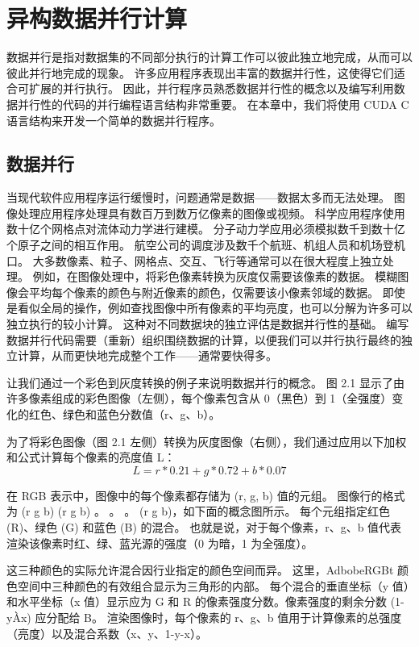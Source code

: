 \section{异构数据并行计算}

数据并行是指对数据集的不同部分执行的计算工作可以彼此独立地完成，从而可以彼此并行地完成的现象。 许多应用程序表现出丰富的数据并行性，这使得它们适合可扩展的并行执行。 因此，并行程序员熟悉数据并行性的概念以及编写利用数据并行性的代码的并行编程语言结构非常重要。 在本章中，我们将使用 CUDA C 语言结构来开发一个简单的数据并行程序。

\subsection{数据并行}
当现代软件应用程序运行缓慢时，问题通常是数据——数据太多而无法处理。 图像处理应用程序处理具有数百万到数万亿像素的图像或视频。 科学应用程序使用数十亿个网格点对流体动力学进行建模。 分子动力学应用必须模拟数千到数十亿个原子之间的相互作用。 航空公司的调度涉及数千个航班、机组人员和机场登机口。 大多数像素、粒子、网格点、交互、飞行等通常可以在很大程度上独立处理。 例如，在图像处理中，将彩色像素转换为灰度仅需要该像素的数据。 模糊图像会平均每个像素的颜色与附近像素的颜色，仅需要该小像素邻域的数据。 即使是看似全局的操作，例如查找图像中所有像素的平均亮度，也可以分解为许多可以独立执行的较小计算。 这种对不同数据块的独立评估是数据并行性的基础。 编写数据并行代码需要（重新）组织围绕数据的计算，以便我们可以并行执行最终的独立计算，从而更快地完成整个工作——通常要快得多。

让我们通过一个彩色到灰度转换的例子来说明数据并行的概念。 图 2.1 显示了由许多像素组成的彩色图像（左侧），每个像素包含从 0（黑色）到 1（全强度）变化的红色、绿色和蓝色分数值（r、g、b）。

为了将彩色图像（图 2.1 左侧）转换为灰度图像（右侧），我们通过应用以下加权和公式计算每个像素的亮度值 L：
\begin{equation*}
	L = r*0.21 + g*0.72 + b * 0.07
\end{equation*}

\begin{remark}
	在 RGB 表示中，图像中的每个像素都存储为 (r, g, b) 值的元组。 图像行的格式为 (r g b) (r g b) 。 。 。 (r g b)，如下面的概念图所示。 每个元组指定红色 (R)、绿色 (G) 和蓝色 (B) 的混合。 也就是说，对于每个像素，r、g、b 值代表渲染该像素时红、绿、蓝光源的强度（0 为暗，1 为全强度）。

这三种颜色的实际允许混合因行业指定的颜色空间而异。 这里，AdbobeRGBt 颜色空间中三种颜色的有效组合显示为三角形的内部。 每个混合的垂直坐标（y 值）和水平坐标（x 值）显示应为 G 和 R 的像素强度分数。像素强度的剩余分数 (1-yÀx) 应分配给 B。 渲染图像时，每个像素的 r、g、b 值用于计算像素的总强度（亮度）以及混合系数（x、y、1-y-x）。
\end{remark}

